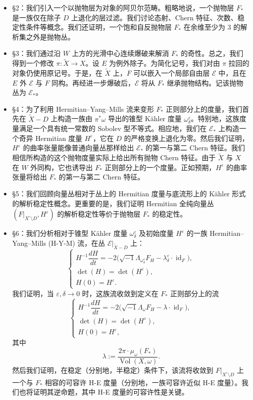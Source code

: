 \documentclass[12pt,a4paper]{article}
\newcommand{\Vol}{\operatorname{Vol}}
\newcommand{\Id}{\operatorname{id}}
\begin{document}
\begin{itemize}
\item \S2：我们引入一个以抛物层为对象的阿贝尔范畴。粗略地说，一个抛物层 \(F_*\) 是一族仅在除子 \(D\) 上退化的层过滤。我们讨论态射、Chern 特征、次数、稳定性条件等概念。我们还证明，一个饱和自反抛物层 \(F_*\) 在余维至少为 3 的解析集之外是抛物丛。

\item \S3：我们通过沿 \(W\) 上方的光滑中心连续爆破来解消 \(F_*\) 的奇性。总之，我们得到一个修改 \(\pi:\widetilde X\to X\)。设 \(E\) 为例外除子。为简化记号，我们对由 \(\pi\) 拉回的对象仍使用原记号。于是，在 \(\widetilde X\) 上，\(F\) 可以嵌入一个局部自由层 \(\mathcal E\) 中，且在 \(E\) 外 \(\mathcal E\) 与 \(F\) 同构。再经进一步爆破后，\(\mathcal E\) 将从 \(F_*\) 继承抛物结构。记该抛物丛为 \(\mathcal E_*\)。

\item \S4：为了利用 Hermitian--Yang--Mills 流来变形 \(F_*\) 正则部分上的度量，我们首先在 \(\widetilde X-D\) 上构造一族由 \(\pi^*\omega\) 导出的锥型 Kähler 度量 \(\omega^\varepsilon_\delta\)。特别地，这族度量满足一个具有统一常数的 Sobolev 型不等式。相应地，我们在 \(\mathcal E_*\) 上构造一个奇异 Hermitian 度量 \(H^\varepsilon\)，它在 \(D\) 的严格变换上退化为零。然后我们证明，\(H^\varepsilon\) 的曲率张量能像普通向量丛那样给出 \(\mathcal E_*\) 的第一与第二 Chern 特征。我们相信所构造的这个抛物度量实际上给出所有抛物 Chern 特征。由于 \(\widetilde X\) 与 \(X\) 在 \(W\) 外同构，它也诱导出 \(F_*\) 正则部分上的一个度量。正如预期，\(H^\varepsilon\) 的曲率张量将给出 \(F_*\) 的第一与第二 Chern 特征。

\item \S5：我们回顾向量丛相对于丛上的 Hermitian 度量与底流形上的 Kähler 形式的解析稳定性概念。更重要的是，我们证明 Hermitian 全纯向量丛 \((F|_{X^\circ\setminus D},H^\varepsilon)\) 的解析稳定性等价于抛物层 \(F_*\) 的稳定性。

\item \S6：我们分析相对于锥型 Kähler 度量 \(\omega^\varepsilon_\delta\) 及初始度量 \(H^\varepsilon\) 的一族 Hermitian--Yang--Mills (H-Y-M) 流，在丛 \(\mathcal E|_{\widetilde X-D}\) 上：
\[
\begin{cases}
H^{-1}\dfrac{dH}{dt}
=
-2\bigl(\sqrt{-1}\Lambda_{\omega^\varepsilon_\delta}F_H-\lambda^\varepsilon_\delta\cdot \Id_F\bigr),\\[0.7em]
\det(H)=\det(H^\varepsilon),\\
H(0)=H^\varepsilon.
\end{cases}
\]
我们证明，当 \(\varepsilon,\delta\to 0\) 时，这族流收敛到定义在 \(F_*\) 正则部分上的流
\[
\begin{cases}
H^{-1}\dfrac{dH}{dt}
=
-2\bigl(\sqrt{-1}\Lambda_\omega F_H-\lambda\cdot \Id_F\bigr),\\[0.7em]
\det(H)=\det(H^\varepsilon),\\
H(0)=H^\varepsilon,
\end{cases}
\]
其中
\[
\lambda:=\frac{2\pi\cdot \mu_\omega(F_*)}{\Vol(X,\omega)}.
\]
然后我们证明，在稳定（分别地，半稳定）条件下，该流将收敛到 \(F|_{X^\circ\setminus D}\) 上一个与 \(F_*\) 相容的可容许 H-E 度量（分别地，一族可容许近似 H-E 度量）。我们也将证明其逆命题，其中 H-E 度量的可容许性是关键。


\end{itemize}
\end{document}

